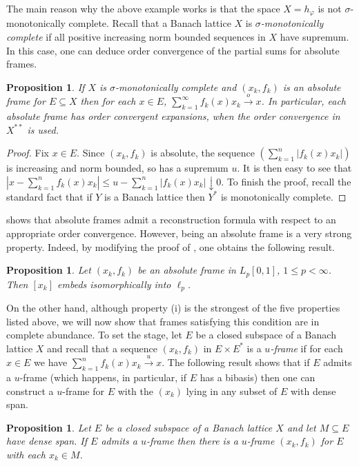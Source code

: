 \documentclass[12pt,leqno]{amsart}
\newtheorem{proposition}[theorem]{Proposition}
\numberwithin{equation}{section}
\theoremstyle{definition}
\begin{document}
The main reason why the above example works is that the space $X=h_\varphi$ is not $\sigma$-monotonically complete. Recall that a Banach lattice $X$ is \emph{$\sigma$-monotonically complete} if  all positive increasing norm  bounded sequences in $X$ have supremum. In this case, one can deduce order convergence of the partial sums for absolute frames.
\begin{proposition}\label{mc}
If $X$ is $\sigma$-monotonically complete and $(x_k,f_k)$ is an absolute frame for $E\subseteq X$ then for each $x\in E$, $\sum_{k=1}^\infty f_k(x)x_k\xrightarrow{o}x$. In particular, each absolute frame has order convergent expansions, when the order convergence in $X^{**}$ is used.
\end{proposition}
\begin{proof}
Fix $x\in E$. Since $(x_k,f_k)$ is absolute, the sequence $(\sum_{k=1}^n|f_k(x)x_k|)$ is increasing and norm bounded, so has a supremum $u$. It is then easy to see that $|x-\sum_{k=1}^nf_k(x)x_k|\leq u-\sum_{k=1}^{n}|f_k(x)x_k|\downarrow 0$. To finish the proof, recall the standard fact that if $Y$ is a Banach lattice then $Y^*$ is monotonically complete. 
\end{proof}
 shows that absolute frames  admit a reconstruction formula with respect to an appropriate order convergence. However, being an absolute frame is a very strong property. Indeed, by modifying the proof of \cite[Theorem 3]{JS}, one  obtains the following result.
\begin{proposition}
Let $(x_k,f_k)$ be an absolute frame in $L_p[0,1]$, $1\leq p<\infty$. Then $[x_k]$ embeds isomorphically into $\ell_p$.
\end{proposition}
On the other hand, although property (i) is the strongest of the five properties listed above, we will now show that frames satisfying this condition are in complete abundance. To set the stage,  let $E$ be a closed subspace of a Banach lattice $X$ and recall that a sequence $(x_k,f_k)$ in $E\times E^*$ is  a  \emph{$u$-frame} if for each $x\in E$ we have $\sum_{k=1}^n f_k(x)x_k\xrightarrow{u}x$. The following result shows that if $E$ admits a $u$-frame (which happens, in particular, if $E$ has a bibasis) then one can construct a $u$-frame for $E$ with the $(x_k)$ lying in any subset of $E$ with dense span.
\begin{proposition}
    Let $E$ be a closed subspace of a Banach lattice $X$ and let $M\subseteq E$ have dense span. If $E$ admits a $u$-frame then there is a $u$-frame $(x_k,f_k)$ for $E$ with each $x_k\in M$.
\end{proposition}
\end{document}
